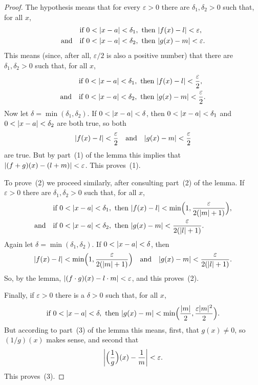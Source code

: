 \begin{proof}
The hypothesis means that for every $\varepsilon>0$ there are
$\delta_1,\delta_2>0$ such that, for all $x$,
\begin{align*}
&\text{if }0<\abs{x-a}<\delta_1,\text{ then }\abs{f(x)-l}<\varepsilon,\\
\text{and}\quad &\text{if }0<\abs{x-a}<\delta_2,\text{ then }\abs{g(x)-m}<\varepsilon.
\end{align*}
This means (since, after all, $\varepsilon/2$ is also a positive number) that
there are $\delta_1,\delta_2>0$ such that, for all $x$,
\begin{align*}
&\text{if }0<\abs{x-a}<\delta_1,\text{ then }\abs{f(x)-l}<\frac{\varepsilon}{2},\\
\text{and}\quad &\text{if }0<\abs{x-a}<\delta_2,\text{ then }\abs{g(x)-m}<\frac{\varepsilon}{2}.
\end{align*}
Now let $\delta=\min(\delta_1,\delta_2)$. If $0<\abs{x-a}<\delta$, then
$0<\abs{x-a}<\delta_1$ and $0<\abs{x-a}<\delta_2$ are both true, so both
\[
\abs{f(x)-l}<\frac{\varepsilon}{2} \quad\text{and}\quad
\abs{g(x)-m}<\frac{\varepsilon}{2}
\]
are true. But by part~(1) of the lemma this implies that
$\abs{(f+g)(x)-(l+m)}<\varepsilon$. This proves~(1).

To prove~(2) we proceed similarly, after consulting part~(2) of the lemma. If
$\varepsilon>0$ there are $\delta_1,\delta_2>0$ such that, for all $x$,
\begin{align*}
&\text{if }0<\abs{x-a}<\delta_1,\text{ then }
\abs{f(x)-l}<\min\Bigl(1,\frac{\varepsilon}{2(\abs{m}+1)}\Bigr),\\
\text{and}\quad &\text{if }0<\abs{x-a}<\delta_2,\text{ then }
\abs{g(x)-m}<\frac{\varepsilon}{2(\abs{l}+1)}.
\end{align*}
Again let $\delta=\min(\delta_1,\delta_2)$. If $0<\abs{x-a}<\delta$, then
\[
\abs{f(x)-l}<\min\Bigl(1,\frac{\varepsilon}{2(\abs{m}+1)}\Bigr)
\quad\text{and}\quad
\abs{g(x)-m}<\frac{\varepsilon}{2(\abs{l}+1)}.
\]
So, by the lemma, $\abs{(f\cdot g)(x)-l\cdot m}<\varepsilon$, and this
proves~(2).

Finally, if $\varepsilon>0$ there is a $\delta>0$ such that, for all $x$,
\[
\text{if }0<\abs{x-a}<\delta,\text{ then }
\abs{g(x)-m}<\min\Bigl(\frac{\abs{m}}{2},\frac{\varepsilon\abs{m}^2}{2}\Bigr).
\]
But according to part~(3) of the lemma this means, first, that $g(x)\neq 0$,
so $(1/g)(x)$ makes sense, and second that
\[
\abs*{\Bigl(\frac{1}{g}\Bigr)(x)-\frac{1}{m}}<\varepsilon.
\]
This proves~(3).
\end{proof}

